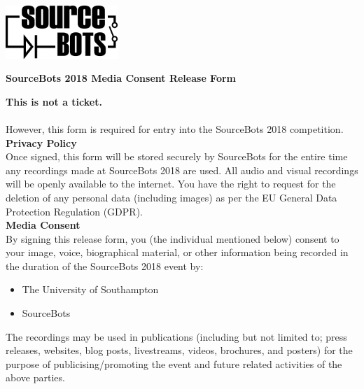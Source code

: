 \documentclass[a4paper]{article}
\begin{document}
\newcommand{\compyear}{2018\xspace}
\newcommand{\competition}{SourceBots \compyear}

\begin{minipage}[c]{0.30\textwidth}
\includegraphics[height=2cm]{fig-SourceBots}
\end{minipage}
\hspace{0.03\textwidth}
\begin{minipage}[c]{0.67\textwidth}
\begin{center}
{\large \textbf{\competition Media Consent Release Form} \par}
\end{center}
\end{minipage}
\vspace{1cm}

\textbf{This is not a ticket.}\\\\ However, this form is required for entry into the \competition competition.\\

\vspace{0.3cm}
\textbf{\large Privacy Policy}\\

Once signed, this form will be stored securely by SourceBots for the entire time any recordings made at \competition are used. All audio and visual recordings will be openly available to the internet. You have the right to request for the deletion of any personal data (including images) as per the EU General Data Protection Regulation (GDPR).\\

\vspace{0.3cm}
\textbf{\large Media Consent}\\

By signing this release form, you (the individual mentioned below) consent to your image, voice, biographical material, or other information being recorded in the duration of the \competition event by:
\begin{itemize}
    \item The University of Southampton
    \item SourceBots
\end{itemize}
 The recordings may be used in publications (including but not limited to; press releases, websites, blog posts, livestreams, videos, brochures, and posters) for the purpose of publicising/promoting the event and future related activities of the above parties.
\end{document}
